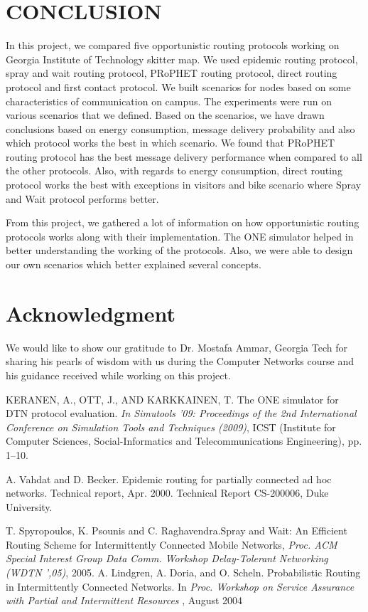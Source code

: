 \documentclass[conference]{IEEEtran}
\begin{document}
\section{CONCLUSION}
In this project, we compared five opportunistic routing protocols working on Georgia Institute of Technology skitter map. We used epidemic routing protocol, spray and wait routing protocol, PRoPHET routing protocol, direct routing protocol and first contact protocol. We built scenarios for nodes based on some characteristics of communication on campus. The experiments were run on various scenarios that we defined. Based on the scenarios, we have drawn conclusions based on energy consumption, message delivery probability and also which protocol works the best in which scenario. We found that PRoPHET routing protocol has the best message delivery performance when compared to all the other protocols. Also, with regards to energy consumption, direct routing protocol works the best with exceptions in visitors and bike scenario where Spray and Wait protocol performs better. 

From this project, we gathered a lot of information on how opportunistic routing protocols works along with their implementation. The ONE simulator helped in better understanding the working of the protocols. Also, we were able to design our own scenarios which better explained several concepts.  


\section*{Acknowledgment}

We would like to show our gratitude to Dr. Mostafa Ammar, Georgia Tech for sharing his pearls of wisdom with us during the Computer Networks course and his guidance received while working on this project.


\begin{thebibliography}{1}
KERANEN, A., OTT, J., AND KARKKAINEN, T. The ONE simulator for DTN protocol evaluation. \emph{In Simutools ’09: Proceedings of the 2nd International Conference on Simulation Tools and Techniques (2009)}, ICST (Institute for Computer Sciences, Social-Informatics and Telecommunications Engineering), pp. 1–10.

A. Vahdat and D. Becker. Epidemic routing for partially connected ad hoc networks. Technical report, Apr. 2000. Technical Report CS-200006, Duke University. 

T. Spyropoulos, K. Psounis and C. Raghavendra.Spray and Wait: An Efficient Routing Scheme for Intermittently Connected Mobile Networks, \emph{Proc. ACM Special Interest Group Data Comm. Workshop Delay-Tolerant Networking (WDTN ',05)}, 2005. 
A. Lindgren, A. Doria, and O. Scheln.   Probabilistic Routing in Intermittently Connected Networks. In\emph{
Proc. Workshop on Service
Assurance with Partial and Intermittent Resources
}, August 2004
\end{thebibliography}
%
%

\end{document}
